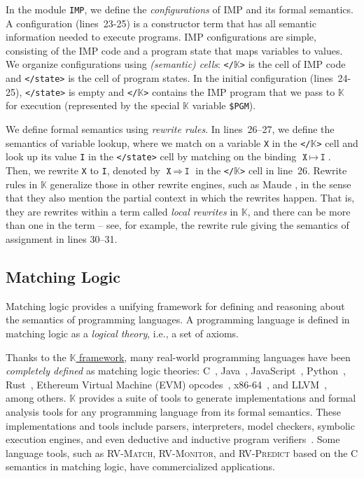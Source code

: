 \documentclass{article}
\theoremstyle{plain}
\theoremstyle{definition}
\newcommand{\To}{\Rightarrow}
\newcommand{\K}{$\mathbb{K}$\xspace}
\newcommand{\code}[1]{\texttt{#1}\xspace}
\newcommand{\celln}[1]{\code{</#1>}}
\begin{document}
In the module \code{IMP}, we define the \emph{configurations} of IMP
and its formal semantics.
A configuration (lines~23-25) is a constructor term
that has all semantic information needed to execute programs.
IMP configurations are simple, consisting of 
the IMP code and a program state that maps variables to values.
We organize configurations using \emph{(semantic) cells}: 
\celln{\K} is the cell of IMP code and \celln{state} is the cell of 
program states. 
In the initial configuration (lines~24-25),
\celln{state} is empty
and \celln{\K} contains the IMP program that we pass to 
\K for execution (represented by the special \K variable \code{\$PGM}). 

We define formal semantics using \emph{rewrite rules}. 
In lines~26--27, we define the semantics of variable lookup,
where we match on a variable \code{X} in the \celln{\K} cell and 
look up its value \code{I} in the \celln{state} cell by matching on the binding
$\code{X} \,{\mapsto}\, \code{I}$. 
Then, we rewrite \code{X} to \code{I},
denoted by $\code{X} \,{\To}\, \code{I}$ 
in the \celln{\K} cell in line~26. 
Rewrite rules in \K generalize those in other rewrite engines, such as Maude \cite{maude}, in the sense that they also mention the partial context in which the rewrites happen.
That is, they are rewrites within a term called {\em local rewrites} in \K, and there can be more than one in the term -- see, for example, the rewrite rule giving the semantics of assignment in lines 30--31.


\subsection{Matching Logic} \label{sec:matching_logic}


Matching logic \cite{Ros17,CR19,CLR21a} provides a unifying framework for defining and reasoning about the semantics of programming languages. 
A programming language is defined in matching logic as a \emph{logical theory}, i.e., a set of axioms.

Thanks to the \href{https://kframework.org}{\K framework}, 
many real-world programming languages have been \emph{completely defined}
as matching logic theories: C~\cite{HER15}, 
Java~\cite{BR15},
JavaScript~\cite{PSR15},
Python~\cite{python-semantics}, 
Rust~\cite{krust-singapore,krust-shanghai},
Ethereum Virtual Machine (EVM) opcodes~\cite{HSZ+18},
x86-64~\cite{DPK+19}, 
and LLVM~\cite{K-llvm},
among others. 
\K provides a suite of tools to
generate implementations and formal analysis tools for any programming language
from its formal semantics. 
These implementations and tools include parsers, interpreters, model checkers, symbolic execution engines, and even deductive and inductive program verifiers~\cite{RS10,SPY+16}.
Some language tools, such as \textsc{RV-Match},
\textsc{RV-Monitor}, and \textsc{RV-Predict}
based on the C semantics in matching logic,
have commercialized applications. 
\end{document}
